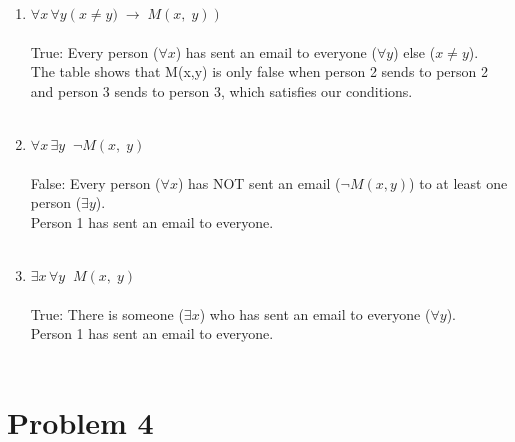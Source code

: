\documentclass{amsart}
\theoremstyle{definition}
\theoremstyle{Exercise}
\theoremstyle{remark}
\theoremstyle{rule}
\numberwithin{equation}{section}
\begin{document}
\begin{enumerate}[label=(\alph*)]

\item $\forall x \, \forall y \left(x\not= y)\;\to \;  M(x,\;y)\right)$\\\\
True: Every person ($\forall x$) has sent an email to everyone ($\forall y$) else ($x \not= y$).\\
The table shows that M(x,y) is only false when person 2 sends to person 2 and person 3 sends to person 3, which satisfies our conditions.
\\\\
\item $\forall x \, \exists y \;\; \neg M(x,\;y)$\\\\
False: Every person ($\forall x$) has NOT sent an email ($\neg M(x,y)$) to at least one person ($\exists y$).\\
Person 1 has sent an email to everyone.
\\\\
\item $\exists x \, \forall y \;\; M(x,\;y)$\\\\
True: There is someone ($\exists x$) who has sent an email to everyone ($\forall y$).\\
Person 1 has sent an email to everyone.
\\\\
\end{enumerate}

\newpage


\section*{Problem 4}
\end{document}
